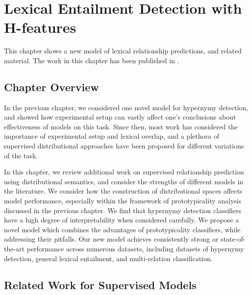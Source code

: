 \chapter{Lexical Entailment Detection with H-features}
\label{ch:hpm}

This chapter shows a new model of lexical relationship predictions, and related
material. The work in this chapter has been published in
.

\section{Chapter Overview}

In the previous chapter, we considered one novel model for hypernymy detection,
and showed how experimental setup can vastly affect one's conclusions about
effectiveness of models on this task. Since then, most work has considered the
importance of experimental setup and lexical overlap, and a plethora of
supervised distributional approaches have been proposed for different variations
of the task.

In this chapter, we review additional work on supervised relationship
prediction using distributional semantics, and consider the strengths of
different models in the literature. We consider how the construction of
distributional spaces affects model performance, especially within the
framework of prototypicality analysis discussed in the previous chapter. We
find that hypernymy detection classifiers have a high degree of
interpretability when considered carefully.  We propose a novel model which
combines the advantages of prototypicality classifiers, while addressing their
pitfalls. Our new model achieves consistently strong or state-of-the-art
performance across numerous datasets, including datasets of hypernymy
detection, general lexical entailment, and multi-relation classification.

\section{Related Work for Supervised Models}

